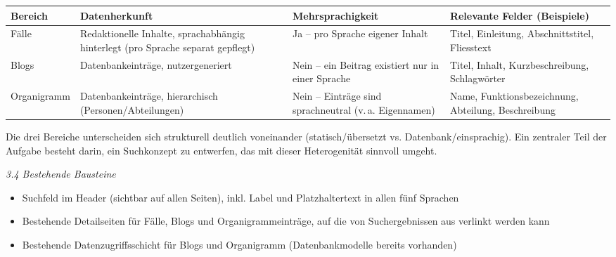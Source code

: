 \documentclass[11pt,a4paper]{article}
\newcommand{\miniheadit}[1]{\par\needspace{5\baselineskip}\noindent\textit{#1}\par\nobreak}
\begin{document}
\begin{center}
\small
\begin{tabularx}{\textwidth}{>{\raggedright\arraybackslash}p{2.3cm} >{\raggedright\arraybackslash}X >{\raggedright\arraybackslash}p{2.6cm} >{\raggedright\arraybackslash}X}
\toprule
\textbf{Bereich} & \textbf{Datenherkunft} & \textbf{Mehrsprachigkeit} & \textbf{Relevante Felder (Beispiele)} \\
\midrule
Fälle & Redaktionelle Inhalte, sprachabhängig hinterlegt (pro Sprache separat gepflegt) & Ja – pro Sprache eigener Inhalt & Titel, Einleitung, Abschnittstitel, Fliesstext \\
Blogs & Datenbankeinträge, nutzergeneriert & Nein – ein Beitrag existiert nur in einer Sprache & Titel, Inhalt, Kurzbeschreibung, Schlagwörter \\
Organigramm & Datenbankeinträge, hierarchisch (Personen/Abteilungen) & Nein – Einträge sind sprachneutral (v.\,a. Eigennamen) & Name, Funktionsbezeichnung, Abteilung, Beschreibung \\
\bottomrule
\end{tabularx}
\end{center}

Die drei Bereiche unterscheiden sich strukturell deutlich voneinander (statisch/übersetzt vs. Datenbank/einsprachig). Ein zentraler Teil der Aufgabe besteht darin, ein Suchkonzept zu entwerfen, das mit dieser Heterogenität sinnvoll umgeht.

\miniheadit{3.4 Bestehende Bausteine}
\begin{itemize}[nosep]
  \item Suchfeld im Header (sichtbar auf allen Seiten), inkl. Label und Platzhaltertext in allen fünf Sprachen
  \item Bestehende Detailseiten für Fälle, Blogs und Organigrammeinträge, auf die von Suchergebnissen aus verlinkt werden kann
  \item Bestehende Datenzugriffsschicht für Blogs und Organigramm (Datenbankmodelle bereits vorhanden)
\end{itemize}
\end{document}
